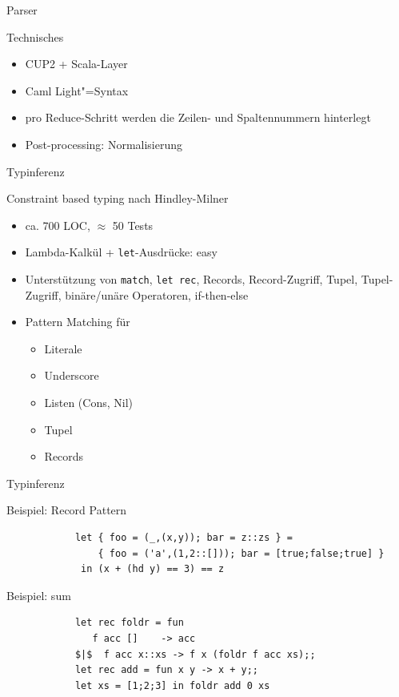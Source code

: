 \documentclass[hyperref={pdfpagelabels=false}]{beamer}
\begin{document}
\begin{frame}{Parser}
  \begin{block}{Technisches}
    \begin{itemize}
      \item CUP2 + Scala-Layer
      \item Caml Light"=Syntax
      \item pro Reduce-Schritt werden die Zeilen- und Spaltennummern hinterlegt
      \item Post-processing: Normalisierung
    \end{itemize}
  \end{block}
\end{frame}

\begin{frame}{Typinferenz}
  \begin{block}{Constraint based typing nach Hindley-Milner}
    \begin{itemize}
      \item ca. 700 LOC, $\approx$ 50 Tests
      \item Lambda-Kalkül + \texttt{let}-Ausdrücke: easy \smiley
      \item Unterstützung von \texttt{match}, \texttt{let rec}, Records, Record-Zugriff, Tupel, Tupel-Zugriff, binäre/unäre Operatoren, if-then-else
      \item Pattern Matching für 
        \begin{itemize}
	  \item Literale
	  \item Underscore
	  \item Listen (Cons, Nil)
	  \item Tupel
	  \item Records
        \end{itemize}
    \end{itemize}
  \end{block}
\end{frame}

\begin{frame}[fragile]{Typinferenz}
  \begin{block}{Beispiel: Record Pattern}
      \begin{verbatim}
            let { foo = (_,(x,y)); bar = z::zs } =
                { foo = ('a',(1,2::[])); bar = [true;false;true] }
             in (x + (hd y) == 3) == z
      \end{verbatim}
  \end{block}
  \begin{block}{Beispiel: sum}
      \begin{verbatim}
            let rec foldr = fun
               f acc []    -> acc
            $|$  f acc x::xs -> f x (foldr f acc xs);;
            let rec add = fun x y -> x + y;;
            let xs = [1;2;3] in foldr add 0 xs
      \end{verbatim}
  \end{block}
\end{frame}
\end{document}
